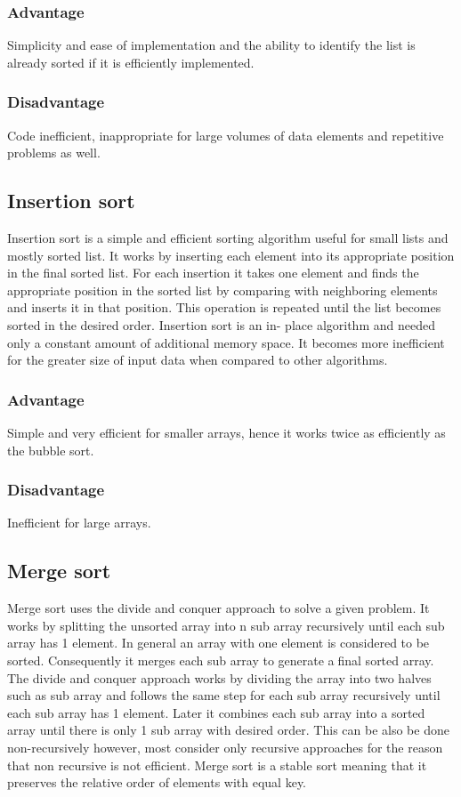 \documentclass{article}
\begin{document}
\subsubsection{Advantage}
	Simplicity and ease of implementation and the ability to identify the list is already sorted if it is efficiently implemented.
	
\subsubsection{Disadvantage}
	Code inefficient, inappropriate for large volumes of data elements and repetitive problems as well.
	
\subsection{Insertion sort}
	Insertion sort is a simple and efficient sorting algorithm useful for small lists and mostly sorted list. It works by inserting each element into its appropriate position in the final sorted list. For each insertion it takes one element and finds the appropriate position in the sorted list by comparing with neighboring elements and inserts it in that position. This operation is repeated until the list becomes sorted in the desired order. Insertion sort is an in- place algorithm and needed only a constant amount of additional memory space. It becomes more inefficient for the greater size of input data when compared to other algorithms.
	
\subsubsection{Advantage}
	 Simple and very efficient for smaller arrays, hence it works twice as efficiently as the bubble sort.

\subsubsection{Disadvantage}	
	 Inefficient for large arrays.
		
\subsection{Merge sort}
	Merge sort uses the divide and conquer approach to solve a given problem. It works by splitting the unsorted array into n sub array recursively until each sub array has 1 element. In general an array with one element is considered to be sorted. Consequently it merges each sub array to generate afinal sorted array. The divide and conquer approach works by dividing the array into two halves such as sub array and follows the same step for each sub array recursively until each sub array has 1 element. Later it combines each sub array into a sorted array until there is only 1 sub array with desired order. This can be also be done non-recursively however, most consider only recursive approaches for the reason that non recursive is not efficient. Merge sort is a stable sort meaning that it preserves the relative order of elements with equal key.
\end{document}
